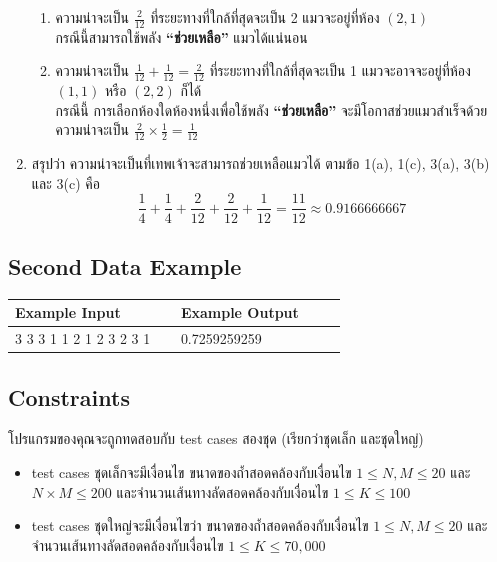 \begin{enumerate}
\begin{enumerate}
        \item ความน่าจะเป็น $\frac{2}{12}$ ที่ระยะทางที่ใกล้ที่สุดจะเป็น 2 
            แมวจะอยู่ที่ห้อง $(2,1)$ \\
            กรณีนี้สามารถใช้พลัง \textbf{“ช่วยเหลือ”} แมวได้แน่นอน
        \item ความน่าจะเป็น $\frac{1}{12}+\frac{1}{12}=\frac{2}{12}$ 
            ที่ระยะทางที่ใกล้ที่สุดจะเป็น 1 
            แมวจะอาจจะอยู่ที่ห้อง $(1,1)$ หรือ $(2,2)$ ก็ได้ \\
            กรณีนี้ การเลือกห้องใดห้องหนึ่งเพื่อใช้พลัง \textbf{“ช่วยเหลือ”} 
            จะมีโอกาสช่วยแมวสำเร็จด้วยความน่าจะเป็น $\frac{2}{12} \times \frac{1}{2}=\frac{1}{12}$
    \end{enumerate}
\item สรุปว่า ความน่าจะเป็นที่เทพเจ้าจะสามารถช่วยเหลือแมวได้ ตามข้อ 1{\hrsp}(a), 1{\hrsp}(c), 
    3{\hrsp}(a), 3{\hrsp}(b) และ 3{\hrsp}(c) คือ
    \[
        \frac{1}{4} + \frac{1}{4} + \frac{2}{12} + \frac{2}{12} + \frac{1}{12} 
        = \frac{11}{12} \approx 0.9166666667
    \]
\end{enumerate}


\subsection*{\sectionfont\upshape Second Data Example}
\begin{tabular}{p{0.45\linewidth}p{0.45\linewidth}}
\toprule
Example Input & Example Output \\    
\midrule
\ttfamily\setstretch{0.8}
3 3 3 \newline
3 1 1 2 \newline
3 1 2 3 \newline
1 2 3 1 &
\ttfamily\setstretch{0.8} 
0.7259259259 \\
\bottomrule
\end{tabular}

\subsection*{\sectionfont\upshape Constraints}

โปรแกรมของคุณจะถูกทดสอบกับ test cases สองชุด (เรียกว่าชุดเล็ก และชุดใหญ่)
\begin{itemize}
\item test cases ชุดเล็กจะมีเงื่อนไข ขนาดของถ้ำสอดคล้องกับเงื่อนไข 
    $1 \leq N,M \leq 20$ และ $N \times M \leq 200$ 
    และจำนวนเส้นทางลัดสอดคล้องกับเงื่อนไข $1 \leq K \leq 100$
\item test cases ชุดใหญ่จะมีเงื่อนไขว่า ขนาดของถ้ำสอดคล้องกับเงื่อนไข 
    $1 \leq N,M \leq 20$ และจำนวนเส้นทางลัดสอดคล้องกับเงื่อนไข $1 \leq K \leq 70,000$
\end{itemize}
